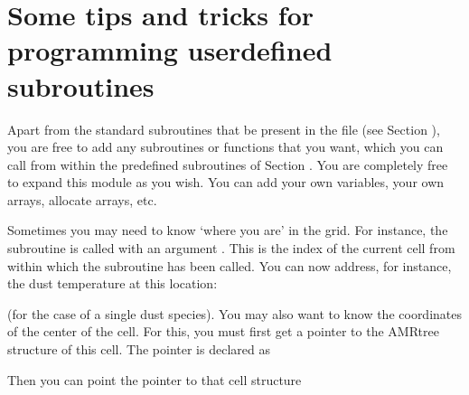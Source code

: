 \documentclass[letterpaper,10pt,english]{sphinxmanual}
\begin{document}
\section{Some tips and tricks for programming user\sphinxhyphen{}defined subroutines}
\label{\detokenize{internalsetup:some-tips-and-tricks-for-programming-user-defined-subroutines}}
Apart from the standard subroutines that  be present in the
 file (see Section {\hyperref[\detokenize{internalsetup:sec-predef-userdef}]{}}), you are
free to add any subroutines or functions that you want, which you can call from
within the predefined subroutines of Section {\hyperref[\detokenize{internalsetup:sec-predef-userdef}]{}}. You are
completely free to expand this module as you wish. You can add your own
variables, your own arrays, allocate arrays, etc.

Sometimes you may need to know ‘where you are’ in the grid. For instance, the
subroutine  is called with an argument . This is the index of the current cell from within which the subroutine has
been called. You can now address, for instance, the dust temperature at this
location:

\begin{sphinxVerbatim}[commandchars=\\\{\}]
  
\end{sphinxVerbatim}

(for the case of a single dust species). You may also want to know the
coordinates of the center of the cell. For this, you must first get a pointer to
the AMR\sphinxhyphen{}tree structure of this cell. The pointer  is declared as

\begin{sphinxVerbatim}[commandchars=\\\{\}]
   
\end{sphinxVerbatim}

Then you can point the pointer to that cell structure
\end{document}
